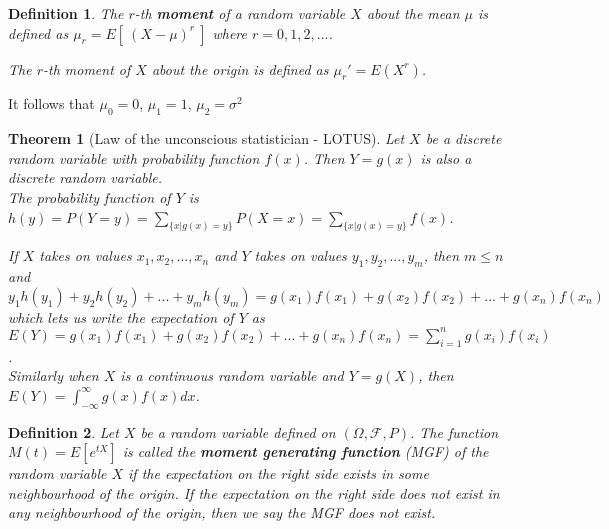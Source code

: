 \documentclass[14pt,twoside]{extreport}
\theoremstyle{dotless}
\newtheorem*{defn}{\footnotesize Definition}
\newtheorem*{thm}{\footnotesize Theorem} %
\begin{document}
\begin{defn}
    The $r$-th \textbf{moment} of a random variable $X$ about the mean $\mu$ is defined as $\mu_r = E[\  (X - \mu)^r \ ]$ where $r=0, 1, 2, ...$.

    The $r$-th moment of $X$ about the origin is defined as $\mu_r ' = E(X^r)$.
\end{defn}

It follows that $\mu_0 = 0$, $\mu_1 = 1$, $\mu_2 = \sigma ^2$

\begin{samepage}
\begin{thm}[Law of the unconscious statistician - LOTUS]
    Let $X$ be a discrete random variable with probability function $f(x)$. Then $Y = g(x)$ is also a discrete random variable. \\ The probability function of $Y$ is $h(y) = P(Y = y) = \sum_{ \{x | g(x) = y \} } P(X = x) = \sum_{ \{x | g(x) = y \} } f(x)$.

    If $X$ takes on values $x_1, x_2, ..., x_n$  and $Y$ takes on values $y_1, y_2, ..., y_m$, then $m \leq n$ and $y_1 h(y_1) + y_2 h(y_2) + ... + y_m h(y_m) = g(x_1) f(x_1) + g(x_2) f(x_2) + ... + g(x_n) f(x_n)$ which lets us write the expectation of $Y$ as \\ $E(Y) = g(x_1)f(x_1) + g(x_2)f(x_2) + ... + g(x_n)f(x_n) = \sum_{i=1}^n g(x_i)f(x_i)$.
    \\ 

    Similarly when $X$ is a continuous random variable and $Y=g(X)$, then $E(Y) = \int_{- \infty}^{\infty} g(x) f(x) dx$.
\end{thm}
\end{samepage}

\begin{defn}
    Let $X$ be a random variable defined on $\left (\Omega,  \mathcal{F}, P\right )$. The function $M\left (t\right ) = E\left [e ^{t X}\right ]$ is called the \textbf{moment generating function} (MGF) of the random variable $X$ if the expectation on the right side exists in some neighbourhood of the origin. If the expectation on the right side does not exist in any neighbourhood of the origin, then we say the MGF does not exist.
\end{defn}
\end{document}
